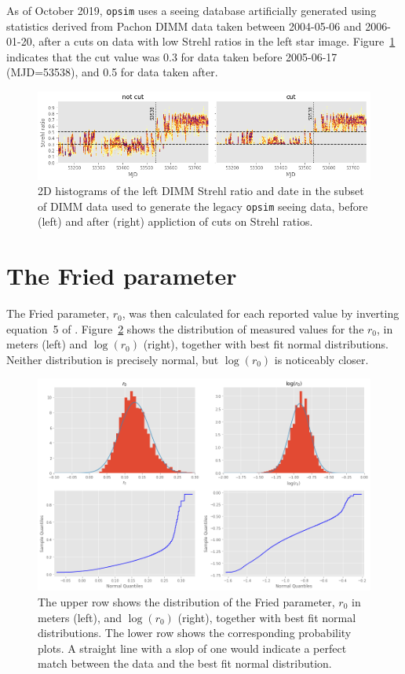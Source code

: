 \documentclass[DM,authoryear,toc]{lsstdoc}
\begin{document}
As of October 2019, \texttt{opsim} uses a seeing database artificially
generated using statistics derived from Pachon DIMM data taken between
2004-05-06 and 2006-01-20, after a cuts on data with low Strehl ratios
in the left star image. Figure~\ref{fig:claver-strehl-cut} indicates
that the cut value was 0.3 for data taken before 2005-06-17
(MJD=53538), and 0.5 for data taken after.

\begin{figure}
  \includegraphics[width=\columnwidth]{./figures/claver_strehl_cut.png}
  \caption{
    2D histograms of the left DIMM Strehl ratio and date in the subset
    of DIMM data used to generate the legacy \texttt{opsim} seeing data, before
    (left) and after (right) appliction of cuts on Strehl ratios.
  }
  \label{fig:claver-strehl-cut}
\end{figure}


\section{The Fried parameter}

The Fried parameter, $r_0$, was then calculated for each reported
value by inverting equation~5 of \cite{2002PASP..114.1156T}.
Figure~\ref{fig:r0-dist} shows the
distribution of measured values for the $r_0$, in meters (left) and
$\log(r_0)$ (right), together with best fit normal
distributions. Neither distribution is precisely normal, but $\log(
r_0)$ is noticeably closer.

\begin{figure}
  \includegraphics[width=\columnwidth]{./figures/r0_dist.png}
  \caption{The upper row shows the distribution of the Fried
    parameter, $r_0$ in meters (left), and $\log(r_0)$ (right),
    together with best fit normal distributions. The lower row shows
    the corresponding probability plots. A straight line with a slop
    of one would indicate a perfect match between the data and the
    best fit normal distribution.}
  \label{fig:r0-dist}
\end{figure}
\end{document}
